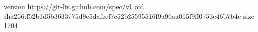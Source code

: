 version https://git-lfs.github.com/spec/v1
oid sha256:f52b1d5b3633775d9e5dafcef7c52b25595516f9a96aa015f9ff0753c46b7b4c
size 1704
